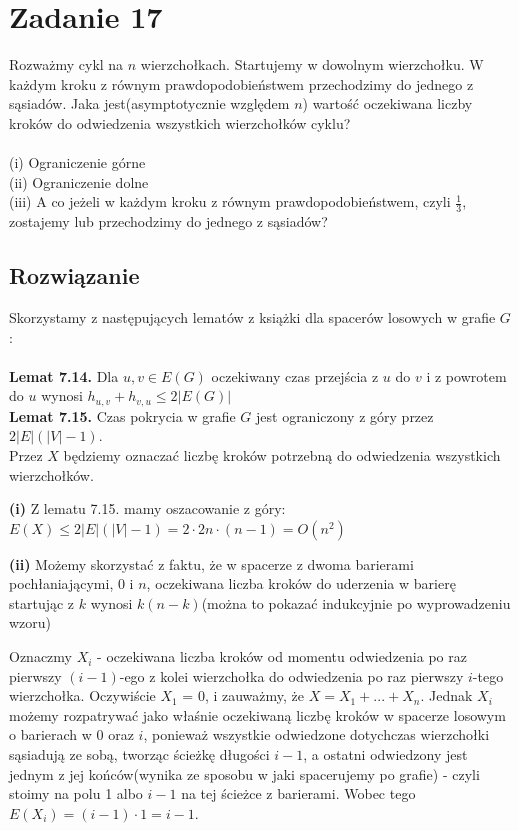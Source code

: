 \section{Zadanie 17}
Rozważmy cykl na \(n\) wierzchołkach. Startujemy w dowolnym wierzchołku. W każdym kroku z równym prawdopodobieństwem przechodzimy do jednego z sąsiadów. Jaka jest(asymptotycznie względem \(n\)) wartość oczekiwana liczby kroków do odwiedzenia wszystkich wierzchołków cyklu? \\
\\
(i) Ograniczenie górne\\
(ii) Ograniczenie dolne\\
(iii) A co jeżeli w każdym kroku z równym prawdopodobieństwem, czyli \(\frac{1}{3}\), zostajemy lub przechodzimy do jednego z sąsiadów?

\subsection*{Rozwiązanie}
Skorzystamy z następujących lematów z książki dla spacerów losowych w grafie \(G\):\\
\\
\textbf{Lemat 7.14.}
Dla \(u,v \in E(G)\) oczekiwany czas przejścia z \(u\) do \(v\) i z powrotem do \(u\) wynosi \(h_{u,v} + h_{v,u} \leq 2|E(G)|\)
\\
\textbf{Lemat 7.15.}
Czas pokrycia w grafie \(G\) jest ograniczony z góry przez \(2|E|(|V|-1)\).
\\

Przez \(X\) będziemy oznaczać liczbę kroków potrzebną do odwiedzenia wszystkich wierzchołków.

\textbf{(i)} Z lematu 7.15. mamy oszacowanie z góry: \(E(X) \leq 2|E|(|V|-1) = 2\cdot 2n\cdot (n-1) = O(n^2)\)


\textbf{(ii)}
Możemy skorzystać z faktu, że w spacerze z dwoma barierami pochłaniającymi, 0 i \(n\), oczekiwana liczba kroków do uderzenia w barierę startując z \(k\) wynosi \(k(n-k)\)(można to pokazać indukcyjnie po wyprowadzeniu wzoru)

Oznaczmy \(X_i\) - oczekiwana liczba kroków od momentu odwiedzenia po raz pierwszy \((i-1)\)-ego z kolei wierzchołka do odwiedzenia po raz pierwszy \(i\)-tego wierzchołka. Oczywiście \(X_1\) = 0, i zauważmy, że \(X = X_1 + ... + X_n\). Jednak \(X_i\) możemy rozpatrywać jako właśnie oczekiwaną liczbę kroków w spacerze losowym o barierach w 0 oraz \(i\), ponieważ wszystkie odwiedzone dotychczas wierzchołki sąsiadują ze sobą, tworząc ścieżkę długości \(i-1\), a ostatni odwiedzony jest jednym z jej końców(wynika ze sposobu w jaki spacerujemy po grafie) - czyli stoimy na polu 1 albo \(i-1\) na tej ścieżce z barierami. Wobec tego \(E(X_i) = (i-1)\cdot 1 = i-1\).

